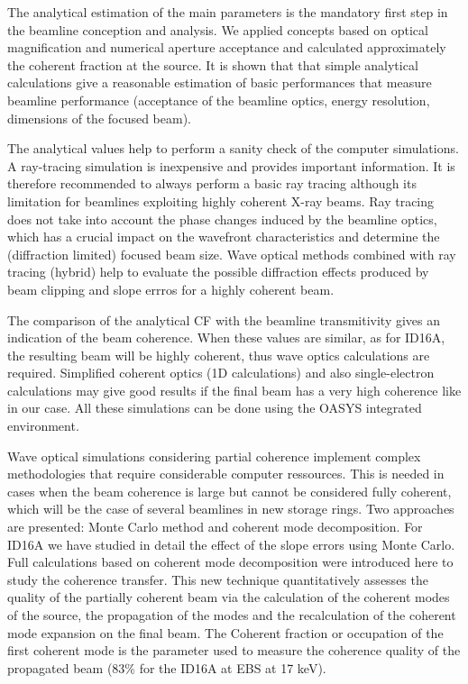 \documentclass{iucr}              %
\newcommand{\inred}[1]{{\color{black}#1}}
\begin{document}
\inred{
The analytical estimation of the main parameters is the mandatory first step in the beamline conception and analysis. We applied concepts based on optical magnification and numerical aperture acceptance and calculated approximately the coherent fraction at the source. 
\inred{It is shown that  that simple analytical calculations give a reasonable estimation of basic performances that measure beamline performance (acceptance of the beamline optics, energy resolution, dimensions of the focused beam).}

The analytical values help to perform a sanity check of the computer simulations. A ray-tracing simulation is inexpensive and provides important information. It is therefore recommended to always perform a basic ray tracing although its limitation for beamlines exploiting highly coherent X-ray beams. Ray tracing does not take into account the
phase changes induced by the beamline optics, which has a crucial impact on the wavefront characteristics and determine the (diffraction limited) focused beam size. Wave optical methods combined with ray tracing (hybrid) help to evaluate the possible diffraction effects produced by beam clipping and slope errros for a highly coherent beam. 

The comparison of the analytical CF with the beamline transmitivity gives an indication of the beam coherence. When these values are similar, as for ID16A, the resulting beam will be highly coherent, thus wave optics calculations are required.  Simplified coherent optics (1D calculations) and also single-electron calculations may give good results if the final beam has a very high coherence like in our case. All these simulations can be done using the OASYS integrated environment. 

Wave optical simulations considering partial coherence implement complex methodologies that require considerable computer ressources.  This is needed in cases when the beam coherence is large but cannot be considered fully coherent, which will be the case of several beamlines in new storage rings. Two approaches are presented:  Monte Carlo method and coherent mode decomposition. For ID16A we have studied in detail the effect of the slope errors using Monte Carlo. Full calculations based on coherent mode decomposition were introduced here to study the coherence transfer. This new technique quantitatively assesses the quality of the partially coherent beam via the calculation of the coherent modes of the source, the propagation of the modes and the recalculation of the coherent mode expansion on the final beam. The Coherent fraction or occupation of the first coherent mode is the parameter used to measure the coherence quality of the propagated beam (83\% for the ID16A at EBS at 17 keV). 

}
\end{document}
